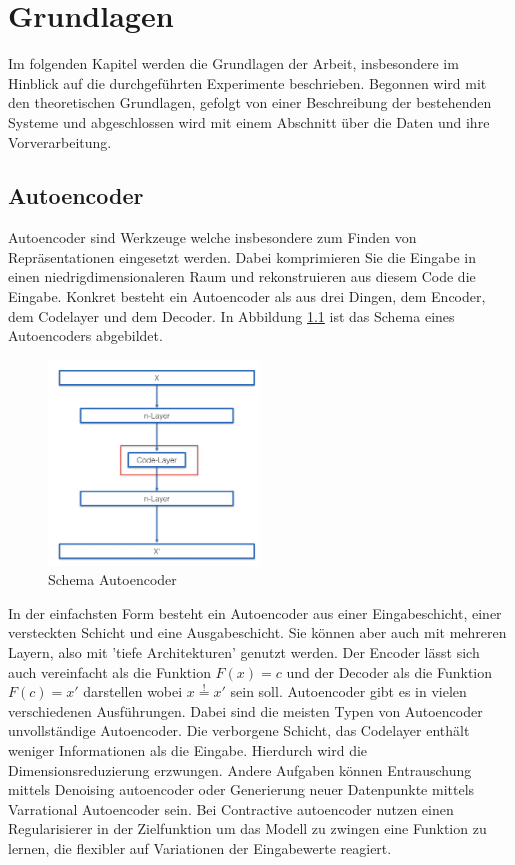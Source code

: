 \chapter{Grundlagen}
\label{chap:Grundlagen}
Im folgenden Kapitel werden die Grundlagen der Arbeit, insbesondere im Hinblick auf die durchgeführten Experimente beschrieben. Begonnen wird mit den theoretischen Grundlagen, gefolgt von einer Beschreibung der bestehenden Systeme und abgeschlossen wird mit einem Abschnitt über die Daten und ihre Vorverarbeitung.

	\section{Autoencoder}
	\label{sec:ConvolutionalAutoencoder}		
	Autoencoder \cite{D.E.Rumelhart.1987} sind Werkzeuge welche insbesondere zum Finden von Repräsentationen eingesetzt werden. Dabei komprimieren Sie die Eingabe in einen niedrigdimensionaleren Raum und rekonstruieren aus diesem Code die Eingabe. Konkret besteht ein Autoencoder als aus drei Dingen, dem Encoder, dem Codelayer und dem Decoder. In Abbildung \ref{img:SchemaCAE} ist das Schema eines Autoencoders abgebildet.
			\begin{figure}[h]
			
				\centering
				\includegraphics[width=0.5\textwidth, center]{bilder/Schema_Autoencoders/Schema_CAE.png}
				\caption[Schema Autoencoder]{Schema Autoencoder}
				\label{img:SchemaCAE}
			\end{figure} 
	In der einfachsten Form besteht ein Autoencoder aus einer Eingabeschicht, einer versteckten Schicht und eine Ausgabeschicht. Sie können aber auch mit mehreren Layern, also mit 'tiefe Architekturen' genutzt werden. \cite{Hinton.2006} Der Encoder lässt sich auch vereinfacht als die Funktion $F(x)=c$ und der Decoder als die Funktion $ F(c)=x'$ darstellen wobei $x\stackrel{!}{=}x'$ sein soll. 
	Autoencoder gibt es in vielen verschiedenen Ausführungen. Dabei sind die meisten Typen von Autoencoder unvollständige Autoencoder. Die verborgene Schicht, das Codelayer enthält weniger Informationen als die Eingabe. Hierdurch wird die Dimensionsreduzierung erzwungen. Andere Aufgaben können Entrauschung mittels Denoising autoencoder \cite{} oder Generierung neuer Datenpunkte mittels Varrational Autoencoder sein. Bei  Contractive autoencoder \cite{} nutzen einen Regularisierer in der Zielfunktion um das Modell zu zwingen eine Funktion zu lernen, die flexibler auf Variationen der Eingabewerte reagiert.   	

